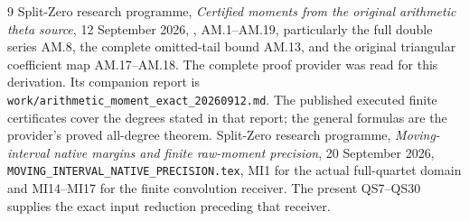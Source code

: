 \documentclass[11pt]{article}
\begin{document}
\begin{thebibliography}{9}
 Split-Zero research programme,
\emph{Certified moments from the original arithmetic theta source},
12 September 2026,
,
AM.1--AM.19, particularly the full double series AM.8,
the complete omitted-tail bound AM.13, and the original
triangular coefficient map AM.17--AM.18.
The complete proof provider was read for this derivation.
Its companion report is
\texttt{work/arithmetic\_moment\_exact\_20260912.md}.
The published executed finite certificates cover the degrees
stated in that report; the general formulas are the provider's
proved all-degree theorem.
 Split-Zero research programme,
\emph{Moving-interval native margins and finite raw-moment precision},
20 September 2026,
\texttt{MOVING\_INTERVAL\_NATIVE\_PRECISION.tex},
MI1 for the actual full-quartet domain and MI14--MI17
for the finite convolution receiver. The present QS7--QS30
supplies the exact input reduction preceding that receiver.
\end{thebibliography}
\end{document}
